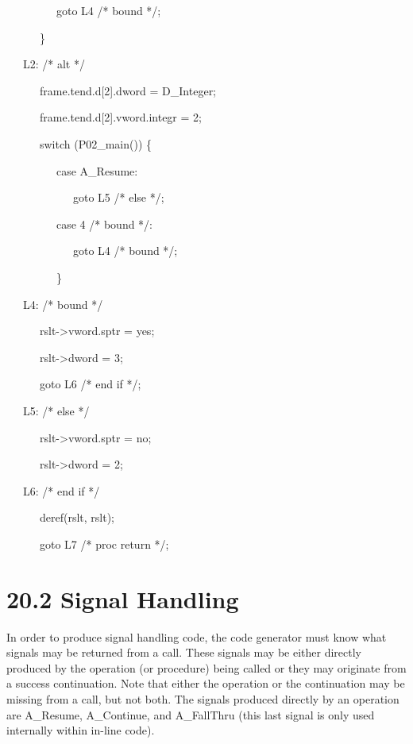 {\ttfamily\mdseries
\ \ \ \ \ \ \ \ \ goto L4 /* bound */;}

{\ttfamily\mdseries
\ \ \ \ \ \ \}}

{\ttfamily\mdseries
\ \ \ L2: /* alt */}

{\ttfamily\mdseries
\ \ \ \ \ \ frame.tend.d[2].dword = D\_Integer;}

{\ttfamily\mdseries
\ \ \ \ \ \ frame.tend.d[2].vword.integr = 2;}

{\ttfamily\mdseries
\ \ \ \ \ \ switch (P02\_main()) \{}

{\ttfamily\mdseries
\ \ \ \ \ \ \ \ \ case A\_Resume:}

{\ttfamily\mdseries
\ \ \ \ \ \ \ \ \ \ \ \ goto L5 /* else */;}

{\ttfamily\mdseries
\ \ \ \ \ \ \ \ \ case 4 /* bound */:}

{\ttfamily\mdseries
\ \ \ \ \ \ \ \ \ \ \ \ goto L4 /* bound */;}

{\ttfamily\mdseries
\ \ \ \ \ \ \ \ \ \}}

{\ttfamily\mdseries
\ \ \ L4: /* bound */}

{\ttfamily\mdseries
\ \ \ \ \ \ rslt-{\textgreater}vword.sptr = yes;}

{\ttfamily\mdseries
\ \ \ \ \ \ rslt-{\textgreater}dword = 3;}

{\ttfamily\mdseries
\ \ \ \ \ \ goto L6 /* end if */;}


\bigskip

{\ttfamily\mdseries
\ \ \ L5: /* else */}

{\ttfamily\mdseries
\ \ \ \ \ \ rslt-{\textgreater}vword.sptr = no;}

{\ttfamily\mdseries
\ \ \ \ \ \ rslt-{\textgreater}dword = 2;}

{\ttfamily\mdseries
\ \ \ L6: /* end if */}

{\ttfamily\mdseries
\ \ \ \ \ \ deref(rslt, rslt);}

{\ttfamily\mdseries
\ \ \ \ \ \ goto L7 /* proc return */;}


\section[20.2 Signal Handling]{20.2 Signal Handling}

In order to produce signal handling code, the code generator must know
what signals may be returned from a call. These signals may be either
directly produced by the operation (or procedure) being called or they
may originate from a success continuation. Note that either the
operation or the continuation may be missing from a call, but not
both. The signals produced directly by an operation are A\_Resume,
A\_Continue, and A\_FallThru (this last signal is only used internally
within in-line code).

